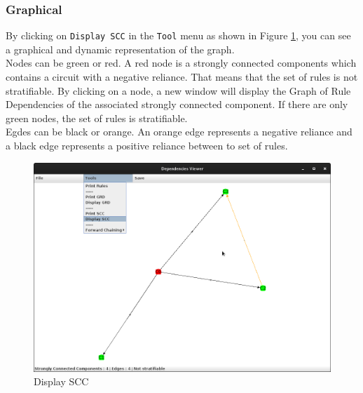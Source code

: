 \documentclass[a4paper, 10pt]{article}
\begin{document}
\subsubsection{Graphical}
By clicking on \verb=Display SCC= in the \verb=Tool= menu as shown in Figure \ref{fig8}, you can see a graphical and dynamic representation of the graph.\\
Nodes can be green or red. A red node is a strongly connected components which contains a circuit with a negative reliance. That means that the set of rules is not stratifiable. By clicking on a node, a new window will display the Graph of Rule Dependencies of the associated strongly connected component. If there are only green nodes, the set of rules is stratifiable.\\
Egdes can be black or orange. An orange edge represents a negative reliance and a black edge represents a positive reliance between to set of rules.
\begin{figure}
\begin{center}
  \includegraphics[scale=0.25]{pics/fig8.png}
  \caption{Display SCC}
\end{center}
\label{fig8}
\end{figure}
\end{document}
